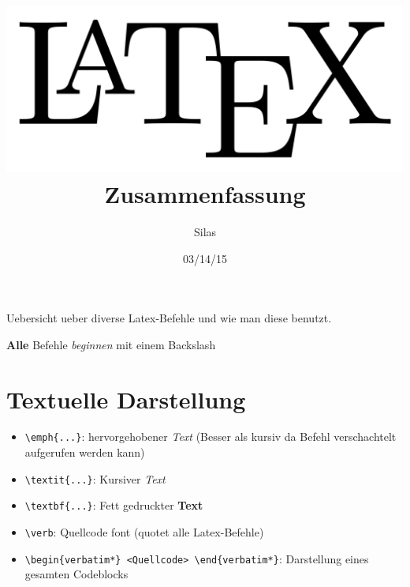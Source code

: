 \documentclass[11pt]{report}
\title{\includegraphics[width=0.5\linewidth]{pics/LaTeXLogo}\\Zusammenfassung}
\author{Silas}
\date{03/14/15}
\begin{document}
\maketitle
\thispagestyle{empty}
Uebersicht ueber diverse Latex-Befehle und wie man diese benutzt.

\textbf{Alle} Befehle \emph{beginnen} mit einem Backslash

\section{Textuelle Darstellung}
\begin{itemize}
  \item \verb|\emph{...}|: hervorgehobener \emph{Text} (Besser als kursiv da Befehl verschachtelt aufgerufen werden kann)
  \item \verb|\textit{...}|: Kursiver \textit{Text}
  \item \verb|\textbf{...}|: Fett gedruckter \textbf{Text}
  \item \verb|\verb|: Quellcode font (quotet alle Latex-Befehle)
  \item \verb|\begin{verbatim*} <Quellcode> \end{verbatim*}|: Darstellung eines gesamten Codeblocks
\end{itemize}
\end{document}
